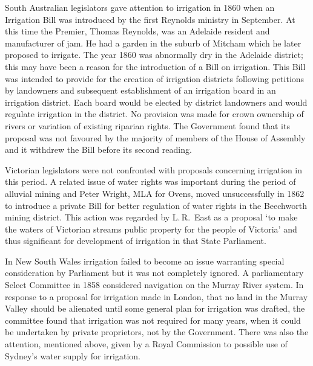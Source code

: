 South Australian  legislators gave attention to
irrigation in 1860 when an Irrigation Bill was introduced by the first
Reynolds ministry in Sept\-em\-ber.  At this time the Premier, Thomas
Reynolds,  was an Adelaide resident and
manufacturer of jam.  He had a garden in the suburb of Mitcham
 which
he later proposed to irrigate.  The year 1860 was abnormally dry in
the Adelaide district; this may have been a reason for the
introduction of a Bill on irrigation.  This Bill was intended to
provide for the creation of irrigation districts following petitions
by landowners and subsequent establishment of an irrigation board in
an irrigation district. Each board would be elected by district
landowners and would regulate irrigation in the district.  No
provision was made for crown ownership of rivers or variation of
existing riparian rights.  The Government found that its proposal was
not favoured by the majority of members of the House of Assembly and
it withdrew the Bill before its second
reading.

Victorian  legislators were not confronted with
proposals concerning irrigation in this period.  A related issue of
water rights was important during the period of alluvial mining and
Peter Wright,  MLA for Ovens, moved unsuccessfully
in 1862 to introduce a private Bill for better regulation of water
rights in the Beechworth mining district.  This action was regarded by
L.\,R.~East  as a proposal `to make the waters of
Victorian streams public property for the people of Victoria' and thus
significant for development of irrigation in that State
Parliament.

In New South Wales  irrigation failed to become
an issue warranting special consideration by Parliament but it was not
completely ignored.  A parliamentary Select Committee in 1858
considered navigation on the Murray River system.  In response to a
proposal for irrigation made in London, that no land in the Murray
Valley should be alienated until some general plan for irrigation was
drafted, the committee found that irrigation was not required for many
years, when it could be undertaken by private proprietors, not by the
Government.  There was also the attention, mentioned above, given by a
Royal Commission to possible use of Sydney's water supply for
irrigation.


